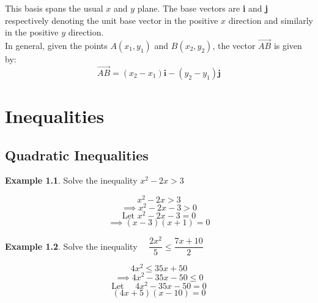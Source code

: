 \documentclass[12pt, a4paper]{report}
\theoremstyle{definition}
\newtheorem{example}{Example}
\begin{document}
	
	This basis spans the usual $x$ and $y$ plane. The base vectors are \textbf{i} and \textbf{j} respectively denoting the unit base vector in the positive $x$ direction and similarly in the positive $y$ direction.\\
	
	In general, given the points $A(x_1,y_1)$ and $B(x_2,y_2)$, the vector $\overrightarrow{AB}$ is given by:
$$	\boxed{\overrightarrow{AB} = (x_2 -x_1)\textbf{i} - (y_2 -y_1)\textbf{j}}$$
	\newpage
	\chapter{Inequalities}
	\section{Quadratic Inequalities}
	\begin{example}
		Solve the inequality $x^2-2x>3$
	\end{example}
	
	\begin{center}
		$$x^2-2x>3$$
		$$\implies x^2-2x-3>0$$
		$$\text{Let }x^2-2x-3=0$$
		$$\implies(x-3)(x+1)=0$$
	\end{center}	
	\begin{center}
	\end{center}
	\hrulefill
	\begin{example}
		Solve the inequality $\quad \dfrac{2x^2}{5} \leq \dfrac{7x+10}{2}$
	\end{example}
	\begin{center}
		$$4x^2 \leq 35x + 50$$
		$$\implies 4x^2-35x-50\leq 0$$
		$$\text{Let }\quad 4x^2-35x-50=0$$
		$$(4x+5)(x-10)=0$$
	\end{center}
	
\end{document}
